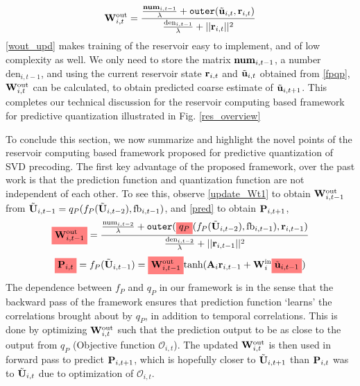 \documentclass[conference]{IEEEtran}
\newcommand{\highlight}[1]{%
  \colorbox{red!50}{$\displaystyle#1$}}
\begin{document}
\begin{equation}
\bW_{i,t}^{\text{out}}=\frac{\frac{\text{\textbf{num}}_{i,t-1}}{\lambda}+\texttt{outer}(\tilde{\bu}_{i,t},\br_{i,t})}{\frac{\text{den}_{i,t-1}}{\lambda}+||\br_{i,t}||^2}
\label{wout_upd}
\end{equation}
\eqref{wout_upd} makes training of the reservoir easy to implement, and of low complexity as well.
We only need to store the matrix $\text{\textbf{num}}_{i,t-1}$, a number $\text{den}_{i,t-1}$, and using the current reservoir state ${\bf r}_{i,t}$ and $\tilde{{\bf u}}_{i,t}$ obtained from \eqref{fpqp}, ${\bf W}_{i,t}^{\text{out}}$ can be calculated, to obtain predicted coarse estimate of $\tilde{{\bf u}}_{i,t+1}$.
This completes our technical discussion for the reservoir computing based framework for predictive quantization illustrated in Fig. \ref{res_overview}

To conclude this section, we now summarize and highlight the novel points of the reservoir computing based framework proposed for predictive quantization of SVD precoding.
The first key advantage of the proposed framework, over the past work \cite{Gupt1905:Predictive,6891198,6545375} is that the prediction function and quantization function are not independent of each other.
To see this, observe \eqref{update_Wt1} to obtain ${\bf W}^{\text{out}}_{i,t-1}$ from $\tilde{{\bf U}}_{i,t-1}=q_P(f_P(\tilde{{\bf U}}_{i,t-2}),\text{fb}_{i,t-1})$, and \eqref{pred} to obtain ${\bf P}_{i,t+1}$,
\begin{equation}
\highlight{\bW_{i,t-1}^{\text{out}}}=\frac{\frac{\text{num}_{i,t-2}}{\lambda}+\texttt{outer}(\highlight{q_P}(f_P(\tilde{\bU}_{i,t-2}),\text{fb}_{i,t-1}),\br_{i,t-1})}{\frac{\text{den}_{i,t-2}}{\lambda}+||\br_{i,t-1}||^2}
\label{update_Wt1}
\end{equation}
\begin{equation}
\highlight{\bP_{i,t}}=f_P(\tilde{\bU}_{i,t-1})=\highlight{\bW^{\text{out}}_{i,t-1}}\text{tanh}(\bA_i\br_{i,t-1}+\bW^{\text{in}}_i\highlight{\tilde{\bu}_{i,t-1}})
\label{pred}
\end{equation}
The dependence between $f_P$ and $q_P$ in our framework is in the sense that the backward pass of the framework ensures that prediction function `learns' the correlations brought about by $q_P$, in addition to temporal correlations. %
This is done by optimizing ${\bf W}_{i,t}^{\text{out}}$ such that the prediction output to be as close to the output from $q_P$ (Objective function $\mathcal{O}_{i,t}$).
The updated ${\bf W}_{i,t}^{\text{out}}$ is then used in forward pass to predict ${\bf P}_{i,t+1}$, which is hopefully closer to $\tilde{{\bf U}}_{i,t+1}$ than ${\bf P}_{i,t}$ was to $\tilde{{\bf U}}_{i,t}$ due to optimization of $\mathcal{O}_{i,t}$.
\end{document}
